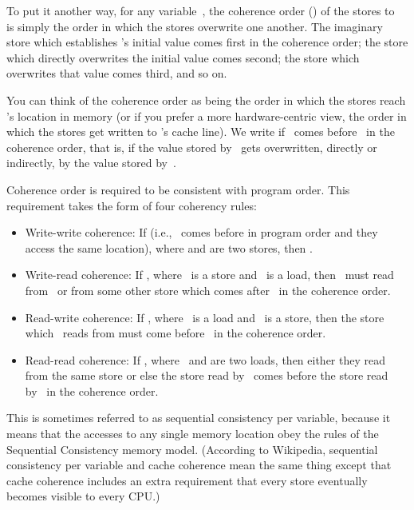 To put it another way, for any variable~, the coherence order
() of the stores to~ is simply the order in which the
stores overwrite one another.
The imaginary store which establishes 's initial value
comes first in the coherence order; the store which directly
overwrites the initial value comes second; the store which overwrites
that value comes third, and so on.

You can think of the coherence order as being the order in which the
stores reach 's location in memory (or if you prefer a more
hardware-centric view, the order in which the stores get written to
's cache line).
We write  if ~comes before~ in the
coherence order, that is, if the value stored by~ gets overwritten,
directly or indirectly, by the value stored by~.

Coherence order is required to be consistent with program order.
This requirement takes the form of four coherency rules:

\begin{itemize}
\item	Write-write coherence:
	If  (i.e., ~comes before  in
	program order and they access the same location), where 
	and  are two stores, then .

\item	Write-read coherence:
	If , where ~is a store and ~is
	a load, then ~must read from~ or from some other
	store which comes after~ in the coherence order.

\item	Read-write coherence:
	If , where ~is a load and ~is
	a store, then the store which ~reads from must come
	before~ in the coherence order.

\item	Read-read coherence:
	If , where ~and  are two loads,
	then either they read from the same store or else the store
	read by~ comes before the store read by~ in the
	coherence order.
\end{itemize}

This is sometimes referred to as sequential consistency per variable,
because it means that the accesses to any single memory location obey
the rules of the Sequential Consistency memory model.
(According to Wikipedia, sequential consistency per variable and cache
coherence mean the same thing except that cache coherence includes an extra
requirement that every store eventually becomes visible to every CPU.)

